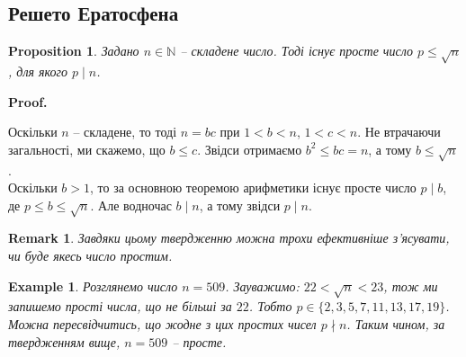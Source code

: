 \documentclass[a4paper, 10pt]{article}
\makeatletter
\theoremstyle{theoremdd}
\theoremstyle{theoremdd}
\theoremstyle{theoremdd}
\theoremstyle{theoremdd}
\newtheorem{example}[theorem]{Example}
\theoremstyle{theoremdd}
\newtheorem{proposition}[theorem]{Proposition}
\theoremstyle{theoremdd}
\newtheorem{remark}[theorem]{Remark}
\theoremstyle{theoremdd}
\theoremstyle{theoremdd}
\renewenvironment{proof}[1][Proof.\\]{\par
\pushQED{\hfill \qed}%
\normalfont \topsep6\p@\@plus6\p@\relax
\trivlist
\item\relax
{\bfseries
#1\@addpunct{.}}\hspace\labelsep\ignorespaces
}{%
\popQED\endtrivlist\@endpefalse
}
\makeatother
\begin{document}
\subsection{Решето Ератосфена}
\begin{proposition}
Задано $n \in \mathbb{N}$ -- складене число. Тоді існує просте число $p \leq \sqrt{n}$, для якого $p \mid n$.
\end{proposition}

\begin{proof}
Оскільки $n$ -- складене, то тоді $n = bc$ при $1 < b < n$, $1 < c < n$. Не втрачаючи загальності, ми скажемо, що $b \leq c$. Звідси отримаємо $b^2 \leq bc = n$, а тому $b \leq \sqrt{n}$.\\
Оскільки $b > 1$, то за основною теоремою арифметики існує просте число $p \mid b$, де $p \leq b \leq \sqrt{n}$. Але водночас $b \mid n$, а тому звідси $p \mid n$.
\end{proof}

\begin{remark}
Завдяки цьому твердженню можна трохи ефективніше з'ясувати, чи буде якесь число простим.
\end{remark}

\begin{example}
Розглянемо число $n = 509$. Зауважимо: $22 < \sqrt{n} < 23$, тож ми запишемо прості числа, що не більші за $22$. Тобто $p \in \{2,3,5,7,11,13,17,19\}$. Можна пересвідчитись, що жодне з цих простих чисел $p \nmid n$. Таким чином, за твердженням вище, $n = 509$ -- просте.
\end{example}
\end{document}
